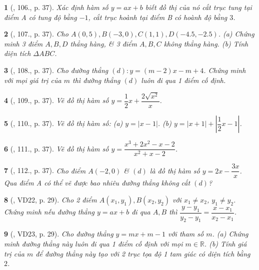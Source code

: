 \documentclass{article}
\newtheorem{baitoan}{}
\begin{document}
\begin{baitoan}[\cite{Tuyen_Toan_9_old}, 106., p. 37]
	Xác định hàm số $y = ax + b$ biết đồ thị của nó cắt trục tung tại điểm A có tung độ bằng $-1$, cắt trục hoành tại điểm B có hoành độ bằng $3$.
\end{baitoan}

\begin{baitoan}[\cite{Tuyen_Toan_9_old}, 107., p. 37]
	Cho $A(0,5),B(-3,0),C(1,1),D(-4.5,-2.5)$. (a) Chứng minh 3 điểm $A,B,D$ thẳng hàng, \& 3 điểm $A,B,C$ không thẳng hàng. (b) Tính diện tích $\Delta ABC$.
\end{baitoan}

\begin{baitoan}[\cite{Tuyen_Toan_9_old}, 108., p. 37]
	Cho đường thẳng $(d):y = (m - 2)x - m + 4$. Chứng minh với mọi giá trị của $m$ thì đường thẳng $(d)$ luôn đi qua 1 điểm cố định.
\end{baitoan}

\begin{baitoan}[\cite{Tuyen_Toan_9_old}, 109., p. 37]
	Vẽ đồ thị hàm số $y = \dfrac{1}{2}x + \dfrac{2\sqrt{x^2}}{x}$.
\end{baitoan}

\begin{baitoan}[\cite{Tuyen_Toan_9_old}, 110., p. 37]
	Vẽ đồ thị hàm số: (a) $y = |x - 1|$. (b) $y = |x + 1| + \left|\dfrac{1}{2}x - 1\right|$.
\end{baitoan}

\begin{baitoan}[\cite{Tuyen_Toan_9_old}, 111., p. 37]
	Vẽ đồ thị hàm số $y = \dfrac{x^3 + 2x^2 - x - 2}{x^2 + x - 2}$.
\end{baitoan}

\begin{baitoan}[\cite{Tuyen_Toan_9_old}, 112., p. 37]
	Cho điểm $A(-2,0)$ \& $(d)$ là đồ thị hàm số $y = 2x - \dfrac{3x}{x}$. Qua điểm A có thể vẽ được bao nhiêu đường thẳng không cắt $(d)$?
\end{baitoan}

\begin{baitoan}[\cite{Binh_Toan_9_tap_1}, VD22, p. 29]
	Cho 2 điểm $A(x_1,y_1),B(x_2,y_2)$ với $x_1\ne x_2$, $y_1\ne y_2$. Chứng minh nếu đường thẳng $y = ax + b$ đi qua $A,B$ thì $ \dfrac{y - y_1}{y_2 - y_1} = \dfrac{x - x_1}{x_2 - x_1}$.
\end{baitoan}

\begin{baitoan}[\cite{Binh_Toan_9_tap_1}, VD23, p. 29]
	Cho đường thẳng $y = mx + m - 1$ với tham số $m$. (a) Chứng minh đường thẳng này luôn đi qua 1 điểm cố định với mọi $m\in\mathbb{R}$. (b) Tính giá trị của $m$ để đường thẳng này tạo với 2 trục tọa độ 1 tam giác có diện tích bằng $2$.
\end{baitoan}
\end{document}

